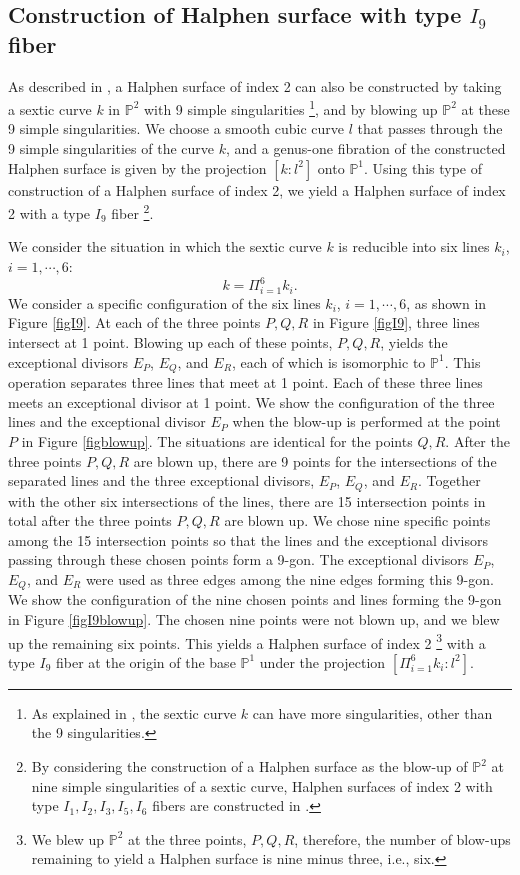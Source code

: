 \documentclass[12pt]{article}
\def\P{\mathbb{P}}
\begin{document}
\subsection{Construction of Halphen surface with type $I_9$ fiber}
\label{ssec 2.3}
As described in \cite{Kimura1801}, a Halphen surface of index 2 can also be constructed by taking a sextic curve $k$ in $\P^2$ with 9 simple singularities \footnote{As explained in \cite{Kimura1801}, the sextic curve $k$ can have more singularities, other than the 9 singularities.}, and by blowing up $\P^2$ at these 9 simple singularities. We choose a smooth cubic curve $l$ that passes through the 9 simple singularities of the curve $k$, and a genus-one fibration of the constructed Halphen surface is given by the projection $[k: l^2]$ onto $\P^1$. Using this type of construction of a Halphen surface of index 2, we yield a Halphen surface of index 2 with a type $I_9$ fiber \footnote{By considering the construction of a Halphen surface as the blow-up of $\P^2$ at nine simple singularities of a sextic curve, Halphen surfaces of index 2 with type $I_1, I_2, I_3, I_5, I_6$ fibers are constructed in \cite{Kimura1801}.}. 
\par We consider the situation in which the sextic curve $k$ is reducible into six lines $k_i$, $i=1, \cdots, 6$:
\begin{equation}
k= \Pi^6_{i=1} k_i.
\end{equation}
We consider a specific configuration of the six lines $k_i$, $i=1, \cdots, 6$, as shown in Figure \ref{figI9}. At each of the three points $P, Q, R$ in Figure \ref{figI9}, three lines intersect at 1 point. Blowing up each of these points, $P, Q, R$, yields the exceptional divisors $E_P$, $E_Q$, and $E_R$, each of which is isomorphic to $\P^1$. This operation separates three lines that meet at 1 point. Each of these three lines meets an exceptional divisor at 1 point. We show the configuration of the three lines and the exceptional divisor $E_P$ when the blow-up is performed at the point $P$ in Figure \ref{figblowup}. The situations are identical for the points $Q, R$. After the three points $P, Q, R$ are blown up, there are 9 points for the intersections of the separated lines and the three exceptional divisors, $E_P$, $E_Q$, and $E_R$. Together with the other six intersections of the lines, there are 15 intersection points in total after the three points $P, Q, R$ are blown up. We chose nine specific points among the 15 intersection points so that the lines and the exceptional divisors passing through these chosen points form a 9-gon. The exceptional divisors $E_P$, $E_Q$, and $E_R$ were used as three edges among the nine edges forming this 9-gon. We show the configuration of the nine chosen points and lines forming the 9-gon in Figure \ref{figI9blowup}. The chosen nine points were not blown up, and we blew up the remaining six points. This yields a Halphen surface of index 2 \footnote{We blew up $\P^2$ at the three points, $P, Q, R$, therefore, the number of blow-ups remaining to yield a Halphen surface is nine minus three, i.e., six.} with a type $I_9$ fiber at the origin of the base $\P^1$ under the projection $[\Pi^6_{i=1}k_i : l^2]$.
\end{document}
